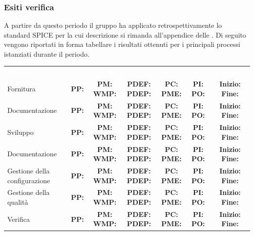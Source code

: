 \subsubsection{Esiti verifica}
A partire da questo periodo il gruppo ha applicato retrospettivamente lo standard SPICE per la cui descrizione si rimanda all'appendice delle . Di seguito vengono riportati in forma tabellare i risultati ottenuti per i principali processi istanziati durante il periodo. 
\begin{table} [H]
	\begin{center}
		\begin{tabular}{|C{3cm}|c|c|c|c|c|c|}
			\textcolor{white}{\textbf{Processo}}&
			\textcolor{white}{\textbf{Liv1}}&
			\textcolor{white}{\textbf{Liv2}}&
			\textcolor{white}{\textbf{Liv3}}&
			\textcolor{white}{\textbf{Liv4}}&
			\textcolor{white}{\textbf{Liv5}}&
			\textcolor{white}{\textbf{Risultato}} \\
				
			Fornitura & \textbf{PP:} & \textbf{PM:} \textbf{WMP:} & \textbf{PDEF:} \textbf{PDEP:} & \textbf{PC:} \textbf{PME:} &
			\textbf{PI:} \textbf{PO:} & \textbf{Inizio:} \textbf{Fine:} \\ \hline
			Documentazione & \textbf{PP:} & \textbf{PM:} \textbf{WMP:} & \textbf{PDEF:} \textbf{PDEP:} & \textbf{PC:} \textbf{PME:} &
			\textbf{PI:} \textbf{PO:} & \textbf{Inizio:} \textbf{Fine:} \\ \hline
			
			Sviluppo & \textbf{PP:} & \textbf{PM:} \textbf{WMP:} & \textbf{PDEF:} \textbf{PDEP:} & \textbf{PC:} \textbf{PME:} &
			\textbf{PI:} \textbf{PO:} & \textbf{Inizio:} \textbf{Fine:} \\ \hline
			
			Documentazione & \textbf{PP:} & \textbf{PM:} \textbf{WMP:} & \textbf{PDEF:} \textbf{PDEP:} & \textbf{PC:} \textbf{PME:} &
			\textbf{PI:} \textbf{PO:} & \textbf{Inizio:} \textbf{Fine:} \\ \hline
			
			Gestione della configurazione & \textbf{PP:} & \textbf{PM:} \textbf{WMP:} & \textbf{PDEF:} \textbf{PDEP:} & \textbf{PC:} \textbf{PME:} &
			\textbf{PI:} \textbf{PO:} & \textbf{Inizio:} \textbf{Fine:} \\ \hline
			
			Gestione della qualità & \textbf{PP:} & \textbf{PM:} \textbf{WMP:} & \textbf{PDEF:} \textbf{PDEP:} & \textbf{PC:} \textbf{PME:} &
			\textbf{PI:} \textbf{PO:} & \textbf{Inizio:} \textbf{Fine:} \\ \hline
			
			Verifica & \textbf{PP:} & \textbf{PM:} \textbf{WMP:} & \textbf{PDEF:} \textbf{PDEP:} & \textbf{PC:} \textbf{PME:} &
			\textbf{PI:} \textbf{PO:} & \textbf{Inizio:} \textbf{Fine:} \\ \hline	
		\end{tabular}
	\end{center}
\end{table}
